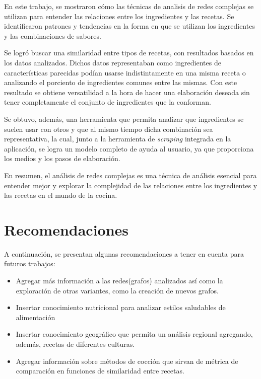 \documentclass[a4paper]{article}
\begin{document}
En este trabajo, se mostraron cómo las técnicas de analisis de redes complejas
se utilizan para entender las relaciones entre los ingredientes y las recetas.
Se identificaron patrones y tendencias en la forma en que se utilizan los
ingredientes y las combinaciones de sabores.

Se logró buscar una similaridad entre tipos de recetas, con resultados
basados en los datos analizados. Dichos datos representaban como ingredientes de
características parecidas podían usarse indistintamente en una misma receta o
analizando el porciento de ingredientes comunes entre las mismas. Con este
resultado se obtiene versatilidad a la hora de hacer una elaboración deseada sin
tener completamente el conjunto de ingredientes que la conforman.

Se obtuvo, además, una herramienta que permita analizar que ingredientes se
suelen usar con otros y que al mismo tiempo dicha combinación sea representativa,
la cual, junto a la herramienta de \emph{scraping} integrada en la aplicación,
se logra un modelo completo de ayuda al usuario, ya que proporciona los medios
y los pasos de elaboración.

En resumen, el análisis de redes complejas es una técnica de análisis esencial
para entender mejor y explorar la complejidad de las relaciones entre los
ingredientes y las recetas en el mundo de la cocina.


\section{Recomendaciones}\label{sec:rec}

A continuación, se presentan algunas recomendaciones a tener en cuenta para
futuros trabajos:
\begin{itemize}
	\item Agregar más información a las redes(grafos) analizados así como la
	exploración de otras variantes, como la creación de nuevos grafos.
	\item Insertar conocimiento nutricional para analizar estilos saludables de
	alimentación
	\item Insertar conocimiento geográfico que permita un análisis regional
	agregando, además, recetas de diferentes culturas.
	\item Agregar información sobre métodos de cocción que sirvan de métrica de
	comparación en funciones de similaridad entre recetas.
\end{itemize}
\end{document}
